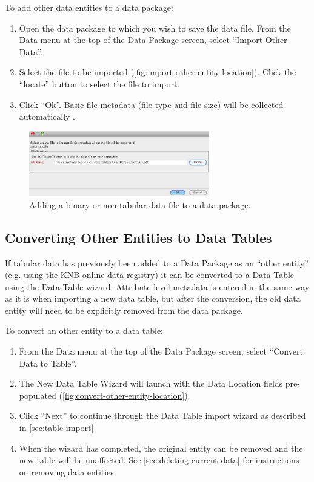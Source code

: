 To add other data entities to a data package:
\begin{enumerate}
  \item Open the data package to which you wish to save the data file.
    From the Data menu at the top of the Data Package screen, select
    ``Import Other Data''.
  \item Select the file to be imported (\autoref{fig:import-other-entity-location}). 
  Click the ``locate'' button to select the file to import.
  \item Click ``Ok''.
  Basic file metadata (file type and file size) will be collected automatically .
\end{enumerate}

\begin{figure}
  \centering
    \includegraphics[width=0.7\textwidth]{images/import-other-entity-location.png}
  \caption{Adding a binary or non-tabular data file to a data package.}
  \label{fig:import-other-entity-location}
\end{figure}

\subsection[Converting Other Entities to Data Tables]{Converting 
Other Entities to Data Tables}
\label{sec:converting-other-entities}

If tabular data has previously been added to a Data Package as 
an ``other entity'' (e.g. using the KNB online data registry) it can be converted
to a Data Table using the Data Table wizard. Attribute-level metadata
is entered in the same way as it is when importing a new data table,
but after the conversion, the old data entity will need to be explicitly removed 
from the data package.

To convert an other entity to a data table:
\begin{enumerate}
  \item From the Data menu at the top of the Data Package screen, select
    ``Convert Data to Table''.
  \item The New Data Table Wizard will launch with the Data Location fields
  pre-populated (\autoref{fig:convert-other-entity-location}). 
  \item Click ``Next'' to continue through the Data Table import wizard as described in
  \autoref{sec:table-import}
  \item When the wizard has completed, the original entity can be removed and the new
  table will be unaffected. See \autoref{sec:deleting-current-data} for instructions on removing
  data entities.
\end{enumerate}

